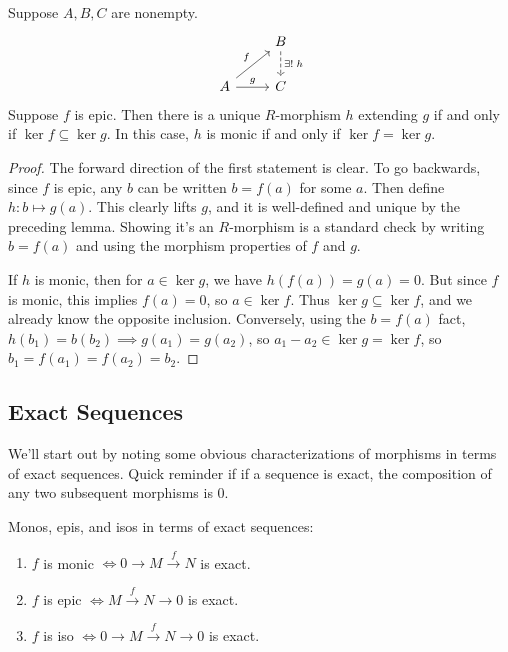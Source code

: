 \documentclass[twoside,10pt]{report}
\begin{document}
\begin{prop}
	\label{prop:unique-ext}
	Suppose $A, B, C$ are nonempty.
	\[
	\begin{tikzcd}
		& B \dar[dashed]{\exists! \; h} \\
		A \arrow[ur, "f"] \rar{g} & C
	\end{tikzcd}
	\] 
	Suppose $f$ is epic. Then there is a unique $R$-morphism $h$ extending $g$ if and only if $\ker f \subseteq \ker g$. In this case, $h$ is monic if and only if $\ker f=\ker g$.
\end{prop}
\begin{proof}
	The forward direction of the first statement is clear. To go backwards, since $f$ is epic, any $b$ can be written $b=f(a)$ for some $a$. Then define $h:b \mapsto g(a)$. This clearly lifts $g$, and it is well-defined and unique by the preceding lemma. Showing it's an $R$-morphism is a standard check by writing $b=f(a)$ and using the morphism properties of $f$ and $g$.

	If $h$ is monic, then for $a \in \ker g$, we have $h(f(a)) = g(a)=0$. But since $f$ is monic, this implies $f(a)=0$, so $a \in \ker f$. Thus $\ker g \subseteq \ker f$, and we already know the opposite inclusion. Conversely, using the $b=f(a)$ fact, $h(b_1)=b(b_2)\implies g(a_1)=g(a_2)$, so $a_1-a_2 \in \ker g = \ker  f$, so $b_1=f(a_1) = f(a_2)=b_2$.
\end{proof}


\subsection{Exact Sequences}

We'll start out by noting some obvious characterizations of morphisms in terms of exact sequences. Quick reminder if if a sequence is exact, the composition of any two subsequent morphisms is 0.
\begin{prop}
	Monos, epis, and isos in terms of exact sequences:
\begin{enumerate}
	\item $f$ is monic $\iff 0\to M \stackrel{f}{\to } N$ is exact.
	\item $f$ is epic $\iff M \stackrel{f}{\to } N \to 0$ is exact.
	\item $f$ is iso $\iff 0 \to M \stackrel{f}{\to } N \to 0$ is exact.
\end{enumerate}
\end{prop}
\end{document}
